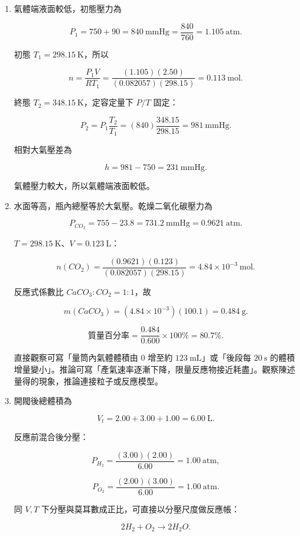 \documentclass[11pt,a4paper]{article}
\begin{document}
\begin{enumerate}
\def\labelenumi{\arabic{enumi}.}
\setcounter{enumi}{12}
\item
  氣體端液面較低，初態壓力為

  \[
  P_1=750+90=840\ \mathrm{mmHg}=\frac{840}{760}=1.105\ \mathrm{atm}.
  \]

  初態 \(T_1=298.15\ \mathrm K\)，所以

  \[
  n=\frac{P_1V}{RT_1}
  =\frac{(1.105)(2.50)}{(0.082057)(298.15)}
  =0.113\ \mathrm{mol}.
  \]

  終態 \(T_2=348.15\ \mathrm K\)，定容定量下 \(P/T\) 固定：

  \[
  P_2=P_1\frac{T_2}{T_1}
  =(840)\frac{348.15}{298.15}
  =981\ \mathrm{mmHg}.
  \]

  相對大氣壓差為

  \[
  h=981-750=231\ \mathrm{mmHg}.
  \]

  氣體壓力較大，所以氣體端液面較低。
\item
  水面等高，瓶內總壓等於大氣壓。乾燥二氧化碳壓力為

  \[
  P_{CO_2}=755-23.8=731.2\ \mathrm{mmHg}=0.9621\ \mathrm{atm}.
  \]

  \(T=298.15\ \mathrm K\)、\(V=0.123\ \mathrm L\)：

  \[
  n(CO_2)=\frac{(0.9621)(0.123)}{(0.082057)(298.15)}
  =4.84\times10^{-3}\ \mathrm{mol}.
  \]

  反應式係數比 \(CaCO_3:CO_2=1:1\)，故

  \[
  m(CaCO_3)=(4.84\times10^{-3})(100.1)=0.484\ \mathrm g.
  \]

  \[
  \text{質量百分率}=\frac{0.484}{0.600}\times100\%=80.7\%.
  \]

  直接觀察可寫「量筒內氣體體積由 \(0\) 增至約 \(123\ \mathrm{mL}\)」或「後段每 \(20\ \mathrm s\) 的體積增量變小」。推論可寫「產氣速率逐漸下降，限量反應物接近耗盡」。觀察陳述量得的現象，推論連接粒子或反應模型。
\item
  開閥後總體積為

  \[
  V_t=2.00+3.00+1.00=6.00\ \mathrm L.
  \]

  反應前混合後分壓：

  \[
  P_{H_2}=\frac{(3.00)(2.00)}{6.00}=1.00\ \mathrm{atm},
  \]

  \[
  P_{O_2}=\frac{(2.00)(3.00)}{6.00}=1.00\ \mathrm{atm}.
  \]

  同 \(V,T\) 下分壓與莫耳數成正比，可直接以分壓尺度做反應帳：

  \[
  2H_2+O_2\rightarrow2H_2O.
  \]


\end{enumerate}
\end{document}
